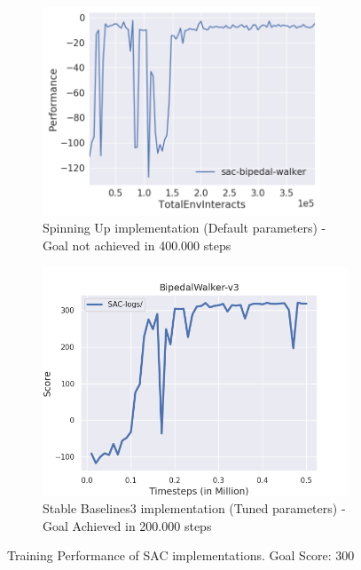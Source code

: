 \documentclass[12pt,twoside]{report}
\begin{document}
\begin{figure}[h]
     \centering
     \begin{subfigure}[t]{0.49\textwidth}
         \centering
         \includegraphics[width=0.91\textwidth]{figures/rl-framework/sac-bipedal-walker.png}
         \caption{Spinning Up implementation (Default parameters) - Goal not achieved in 400.000 steps}
     \end{subfigure}
     \hfill
     \begin{subfigure}[t]{0.49\textwidth}
         \centering
         \includegraphics[width=\textwidth]{figures/rl-framework/sb3-sac-BipedalWalker-v3.png}
         \caption{Stable Baselines3 implementation (Tuned parameters) - Goal Achieved in 200.000 steps}
     \end{subfigure}
        \caption{Training Performance of SAC implementations. Goal Score: 300}
        \label{fig:spinup-vs-sb3}
\end{figure}
\end{document}
